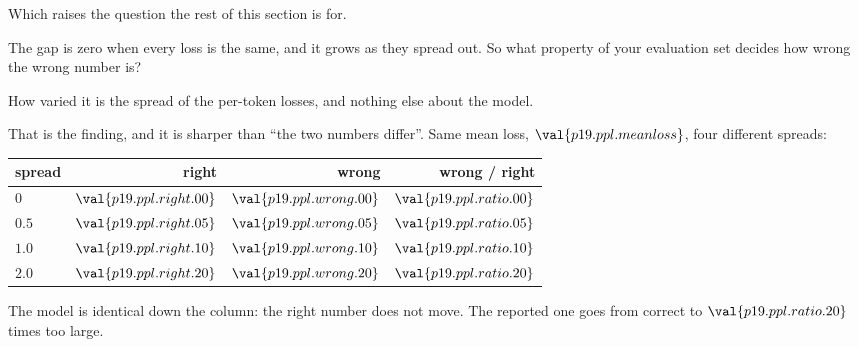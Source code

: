 \begin{fr}
Which raises the question the rest of this section is for.

The gap is zero when every loss is the same, and it grows as they spread out.
So what property of your evaluation set decides how wrong the wrong number is?
\nextframe
\end{fr}

\begin{fr}
\begin{ansblock}
How varied it is \dash{} the spread of the per-token losses, and nothing
else about the model.
\end{ansblock}

That is the finding, and it is sharper than \enquote{the two numbers differ}.
Same mean loss, $\val{p19.ppl.meanloss}$, four different spreads:

\begin{center}
\begin{tabular}{lrrr}
\toprule
spread & right & wrong & wrong / right \\
\midrule
$0$ & $\val{p19.ppl.right.00}$ & $\val{p19.ppl.wrong.00}$ & $\val{p19.ppl.ratio.00}$ \\
$\num{0.5}$ & $\val{p19.ppl.right.05}$ & $\val{p19.ppl.wrong.05}$ & $\val{p19.ppl.ratio.05}$ \\
$\num{1.0}$ & $\val{p19.ppl.right.10}$ & $\val{p19.ppl.wrong.10}$ & $\val{p19.ppl.ratio.10}$ \\
$\num{2.0}$ & $\val{p19.ppl.right.20}$ & $\val{p19.ppl.wrong.20}$ & $\val{p19.ppl.ratio.20}$ \\
\bottomrule
\end{tabular}
\end{center}

The model is identical down the column: the right number does not move. The
reported one goes from correct to $\val{p19.ppl.ratio.20}$ times too large.

\end{fr}

